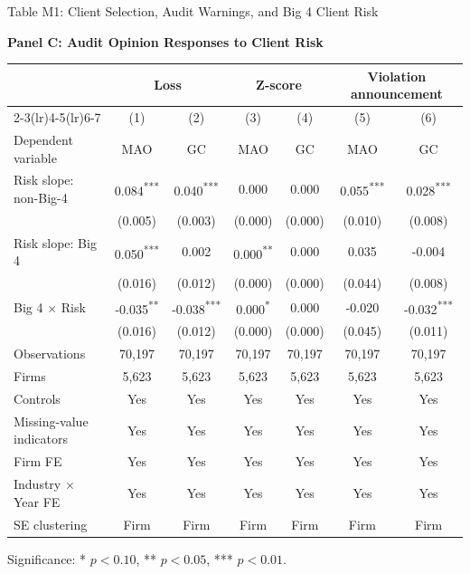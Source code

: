 \documentclass[10pt]{article}
\newcommand{\sym}[1]{\textsuperscript{#1}}
\begin{document}
\begin{minipage}{19cm}\fontsize{10}{12}\selectfont\setlength{\tabcolsep}{4pt}\renewcommand{\arraystretch}{1.15}

\begin{center} Table M1: Client Selection, Audit Warnings, and Big 4 Client Risk\end{center}
\noindent\textbf{Panel C: Audit Opinion Responses to Client Risk}\par\medskip
\begin{center}\begin{tabular*}{\textwidth}{@{\extracolsep{\fill}}lcccccc@{}}
\toprule
 & \multicolumn{2}{c}{Loss} & \multicolumn{2}{c}{Z-score} & \multicolumn{2}{c}{Violation announcement} \\
\cmidrule(lr){2-3}\cmidrule(lr){4-5}\cmidrule(lr){6-7}
 & (1) & (2) & (3) & (4) & (5) & (6) \\
Dependent variable & MAO & GC & MAO & GC & MAO & GC \\
\midrule
Risk slope: non-Big-4 & 0.084\sym{***} & 0.040\sym{***} & 0.000 & 0.000 & 0.055\sym{***} & 0.028\sym{***} \\
 & (0.005) & (0.003) & (0.000) & (0.000) & (0.010) & (0.008) \\
Risk slope: Big 4 & 0.050\sym{***} & 0.002 & 0.000\sym{**} & 0.000 & 0.035 & -0.004 \\
 & (0.016) & (0.012) & (0.000) & (0.000) & (0.044) & (0.008) \\
Big 4 $\times$ Risk & -0.035\sym{**} & -0.038\sym{***} & 0.000\sym{*} & 0.000 & -0.020 & -0.032\sym{***} \\
 & (0.016) & (0.012) & (0.000) & (0.000) & (0.045) & (0.011) \\
\midrule
Observations & 70,197 & 70,197 & 70,197 & 70,197 & 70,197 & 70,197 \\
Firms & 5,623 & 5,623 & 5,623 & 5,623 & 5,623 & 5,623 \\
Controls & Yes & Yes & Yes & Yes & Yes & Yes \\
Missing-value indicators & Yes & Yes & Yes & Yes & Yes & Yes \\
Firm FE & Yes & Yes & Yes & Yes & Yes & Yes \\
Industry $\times$ Year FE & Yes & Yes & Yes & Yes & Yes & Yes \\
SE clustering & Firm & Firm & Firm & Firm & Firm & Firm \\
\bottomrule\end{tabular*}\end{center}

\par\smallskip\raggedright\fontsize{9}{11}\selectfont Significance: * $p<0.10$, ** $p<0.05$, *** $p<0.01$.
\end{minipage}
\end{document}
